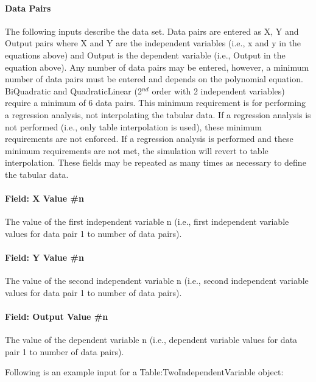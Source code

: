 \paragraph{Data Pairs}\label{data-pairs-1}

The following inputs describe the data set. Data pairs are entered as X, Y and Output pairs where X and Y are the independent variables (i.e., x and y in the equations above) and Output is the dependent variable (i.e., Output in the equation above). Any number of data pairs may be entered, however, a minimum number of data pairs must be entered and depends on the polynomial equation. BiQuadratic and QuadraticLinear (2\(^{nd}\) order with 2 independent variables) require a minimum of 6 data pairs. This minimum requirement is for performing a regression analysis, not interpolating the tabular data. If a regression analysis is not performed (i.e., only table interpolation is used), these minimum requirements are not enforced. If a regression analysis is performed and these minimum requirements are not met, the simulation will revert to table interpolation. These fields may be repeated as many times as necessary to define the tabular data.

\paragraph{Field: X Value \#n}\label{field-x-value-n-1}

The value of the first independent variable n (i.e., first independent variable values for data pair 1 to number of data pairs).

\paragraph{Field: Y Value \#n}\label{field-y-value-n}

The value of the second independent variable n (i.e., second independent variable values for data pair 1 to number of data pairs).

\paragraph{Field: Output Value \#n}\label{field-output-value-n-1}

The value of the dependent variable n (i.e., dependent variable values for data pair 1 to number of data pairs).

Following is an example input for a Table:TwoIndependentVariable object:

